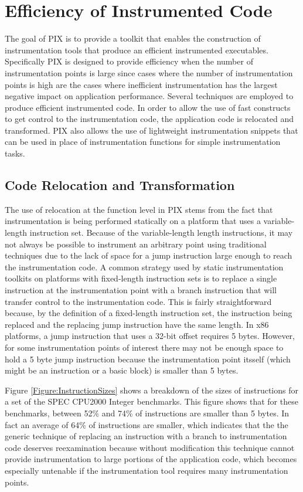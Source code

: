\section{Efficiency of Instrumented Code}

The goal of PIX is to provide a toolkit that enables the construction of
instrumentation tools that produce an efficient instrumented
executables. Specifically PIX is designed to provide efficiency when
the number of instrumentation points is large since cases where the number of
instrumentation points is high are the cases where inefficient instrumentation
has the largest negative impact on application performance. 
Several techniques are employed to produce efficient instrumented code. In order
to allow the use of fast constructs to get control to the instrumentation code,
the application code is relocated and transformed. PIX also allows the use
of lightweight instrumentation snippets that can be used in place of
instrumentation functions for simple instrumentation tasks.

\subsection{Code Relocation and Transformation}
\label{Subsection:Relocation}
The use of relocation at the function level in PIX stems from the fact
that instrumentation is being performed statically on a platform that uses a
variable-length instruction set. Because of the variable-length length instructions, it may not always be possible to instrument
an arbitrary point using traditional techniques due to the lack of space for a jump instruction large enough to reach the instrumentation code. 
A common strategy used by static instrumentation toolkits on platforms with fixed-length instruction sets is to
replace a single instruction at the instrumentation point with a
branch instruction that will transfer control to the instrumentation code. This is fairly straightforward because, by the
definition of a fixed-length instruction set, the instruction being replaced and
the replacing jump instruction have the same length. 
In x86 platforms, a jump instruction that uses a 32-bit offset requires 5 bytes. However, for some
instrumentation points of interest there may not be enough space to hold a 5 byte
jump instruction because the instrumentation point itsself (which might be an instruction or a
basic block) is smaller than 5 bytes. 

Figure \ref{Figure:InstructionSizes} shows a breakdown of the sizes of
instructions for a set of the SPEC CPU2000 Integer benchmarks. This figure shows that for these benchmarks,
between 52\% and 74\% of instructions are smaller than 5 bytes. In fact an average of 64\% of instructions
are smaller, which indicates that the the generic technique of replacing 
an instruction with a branch to instrumentation code deserves reexamination because without modification
this technique cannot provide instrumentation to large portions of the application code, which becomes
especially untenable if the instrumentation tool requires many instrumentation points.

